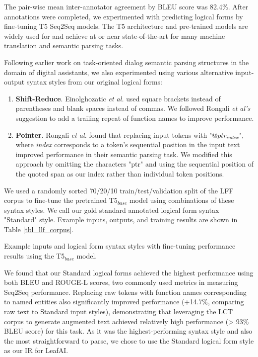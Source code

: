 \documentclass[../main.tex]{subfiles}
\begin{document}
The pair-wise mean inter-annotator agreement by BLEU score was 82.4\%. After annotations were completed, we experimented with predicting logical forms by fine-tuning T5 \cite{raffel2020exploring} Seq2Seq models. The T5 architecture and pre-trained models are widely used for and achieve at or near state-of-the-art for many machine translation and semantic parsing tasks. 

Following earlier work on task-oriented dialog semantic parsing structures in the domain of digital assistants, we also experimented using various alternative input-output syntax styles from our original logical forms:

\begin{enumerate}
    \item \textbf{Shift-Reduce}. Einolghozatic \textit{et al.} \cite{einolghozati2019improving} used square brackets instead of parentheses and blank spaces instead of commas. We followed Rongali \textit{et al's} suggestion to add a trailing repeat of function names to improve performance.
    \item \textbf{Pointer}. Rongali \textit{et al.} \cite{rongali2020don} found that replacing input tokens with "$@ptr_{index}$", where \textit{index} corresponds to a token's sequential position in the input text improved performance in their semantic parsing task. We modified this approach by omitting the characters "ptr" and using the sequential position of the quoted span as our index rather than individual token positions.
\end{enumerate}

We used a randomly sorted 70/20/10 train/test/validation split of the LFF corpus to fine-tune the pretrained T5$_{base}$ model using combinations of these syntax styles. We call our gold standard annotated logical form syntax "Standard" style. Example inputs, outputs, and training results are shown in Table \ref{tbl_llf_corpus}. 

\begin{table}[t!]
    \footnotesize
    \centering
    
    \caption{Example inputs and logical form syntax styles with fine-tuning performance results using the T5$_{base}$ model.}
    \label{tbl_llf_corpus}
\end{table} 

We found that our Standard logical forms achieved the highest performance using both BLEU \cite{lin2004rouge} and ROUGE-L \cite{callison2006re} scores, two commonly used metrics in measuring Seq2Seq performance. Replacing raw tokens with function names corresponding to named entities also significantly improved performance (+14.7\%, comparing raw text to Standard input styles), demonstrating that leveraging the LCT corpus to generate augmented text achieved relatively high performance (> 93\% BLEU score) for this task. As it was the highest-performing syntax style and also the most straightforward to parse, we chose to use the Standard logical form style as our IR for LeafAI.
\end{document}
